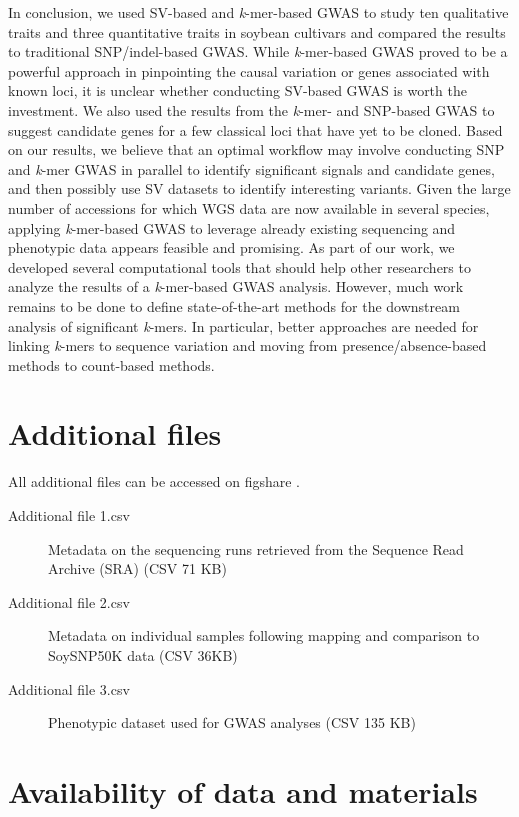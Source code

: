 In conclusion, we used SV-based and \emph{k}-mer-based GWAS to study ten
qualitative traits and three quantitative traits in soybean cultivars and
compared the results to traditional SNP/indel-based GWAS. While
\emph{k}-mer-based GWAS proved to be a powerful approach in pinpointing the
causal variation or genes associated with known loci, it is unclear whether
conducting SV-based GWAS is worth the investment. We also used the
results from the \emph{k}-mer- and SNP-based GWAS to suggest candidate genes
for a few classical loci that have yet to be cloned. Based on our results, we
believe that an optimal workflow may involve conducting SNP and \emph{k}-mer
GWAS in parallel to identify significant signals and candidate genes, and then
possibly use SV datasets to identify interesting variants. Given the large
number of accessions for which WGS data are now available in several species,
applying \emph{k}-mer-based GWAS to leverage already existing sequencing and
phenotypic data appears feasible and promising. As part of our work, we
developed several computational tools that should help other researchers to
analyze the results of a \emph{k}-mer-based GWAS analysis. However, much work
remains to be done to define state-of-the-art methods for the downstream
analysis of significant \emph{k}-mers. In particular, better approaches are
needed for linking \emph{k}-mers to sequence variation and moving from
presence/absence-based methods to count-based methods.

\section*{Additional files}
\label{sv-gwas-additional-files}

All additional files can be accessed on figshare \citep{kmer-gwas-figshare}.

\begin{description}
	\item[Additional file 1.csv] Metadata on the sequencing runs retrieved
		from the Sequence Read Archive (SRA) (CSV 71 KB)
	\item[Additional file 2.csv] Metadata on individual samples following mapping
		and comparison to SoySNP50K data (CSV 36KB)
	\item[Additional file 3.csv] Phenotypic dataset used for GWAS analyses (CSV 135
		KB)
\end{description}

\section*{Availability of data and materials}
\label{sv-gwas-availability}

